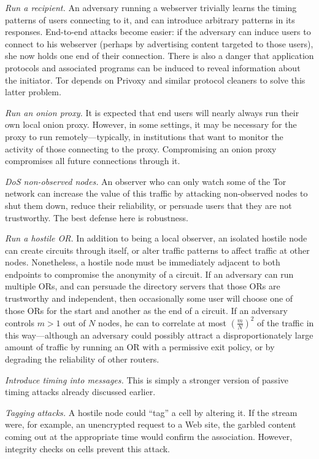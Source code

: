 \documentclass[times,10pt,twocolumn]{article}
\begin{document}
\emph{Run a recipient.} An adversary running a webserver
trivially learns the timing patterns of users connecting to it, and
can introduce arbitrary patterns in its responses.
End-to-end attacks become easier: if the adversary can induce
users to connect to his webserver (perhaps by advertising
content targeted to those users), she now holds one end of their
connection.  There is also a danger that application
protocols and associated programs can be induced to reveal information
about the initiator. Tor depends on Privoxy and similar protocol cleaners
to solve this latter problem.

\emph{Run an onion proxy.} It is expected that end users will
nearly always run their own local onion proxy. However, in some
settings, it may be necessary for the proxy to run
remotely---typically, in institutions that want
to monitor the activity of those connecting to the proxy.
Compromising an onion proxy compromises all future connections
through it.

\emph{DoS non-observed nodes.} An observer who can only watch some
of the Tor network can increase the value of this traffic
by attacking non-observed nodes to shut them down, reduce
their reliability, or persuade users that they are not trustworthy.
The best defense here is robustness.

\emph{Run a hostile OR.}  In addition to being a local observer,
an isolated hostile node can create circuits through itself, or alter
traffic patterns to affect traffic at other nodes. Nonetheless, a hostile
node must be immediately adjacent to both endpoints to compromise the
anonymity of a circuit. If an adversary can
run multiple ORs, and can persuade the directory servers
that those ORs are trustworthy and independent, then occasionally
some user will choose one of those ORs for the start and another
as the end of a circuit. If an adversary
controls $m>1$ out of $N$ nodes, he can to correlate at most
$\left(\frac{m}{N}\right)^2$ of the traffic in this way---although an
adversary
could possibly attract a disproportionately large amount of traffic
by running an OR with a permissive exit policy, or by
degrading the reliability of other routers.

\emph{Introduce timing into messages.} This is simply a stronger
version of passive timing attacks already discussed earlier.

\emph{Tagging attacks.} A hostile node could ``tag'' a
cell by altering it. If the
stream were, for example, an unencrypted request to a Web site,
the garbled content coming out at the appropriate time would confirm
the association. However, integrity checks on cells prevent
this attack.
\end{document}
